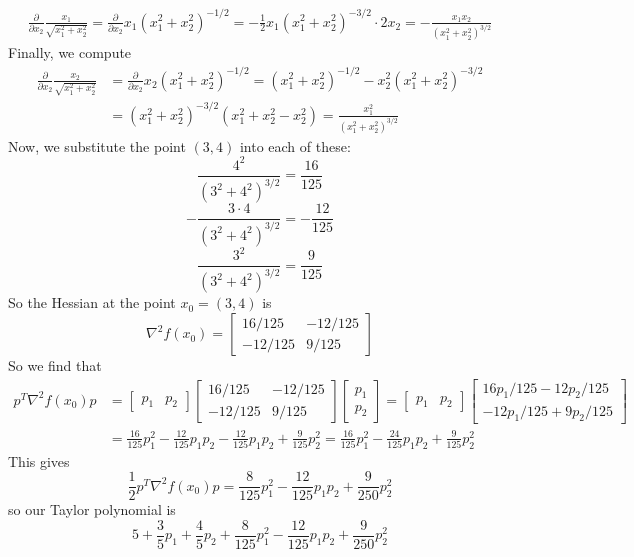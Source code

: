 \documentclass[12pt]{article}
\begin{document}
\begin{align*}
\frac{\partial}{\partial x_2} \frac{x_1}{\sqrt{x_1^2+x_2^2}} = \frac{\partial}{\partial x_2} x_1(x_1^2+x_2^2)^{-1/2} = -\frac{1}{2}x_1(x_1^2+x_2^2)^{-3/2}\cdot2x_2 = -\frac{x_1x_2}{(x_1^2+x_2^2)^{3/2}}
\end{align*} Finally, we compute
\begin{align*}
\frac{\partial}{\partial x_2} \frac{x_2}{\sqrt{x_1^2+x_2^2}} &= \frac{\partial}{\partial x_2} x_2(x_1^2+x_2^2)^{-1/2} = (x_1^2+x_2^2)^{-1/2} - x_2^2(x_1^2+x_2^2)^{-3/2}\\
& = (x_1^2+x_2^2)^{-3/2}(x_1^2+x_2^2 - x_2^2) = \frac{x_1^2}{(x_1^2+x_2^2)^{3/2}}
\end{align*} Now, we substitute the point $(3,4)$ into each of these:
\[
\frac{4^2}{(3^2+4^2)^{3/2}} = \frac{16}{125}
\]
\[
-\frac{3 \cdot 4}{(3^2+4^2)^{3/2}} = -\frac{12}{125}
\]
\[
\frac{3^2}{(3^2+4^2)^{3/2}} = \frac{9}{125}
\] So the Hessian at the point $x_0 = (3,4)$ is
\[
\nabla^2 f(x_0) =
\begin{bmatrix}
16/125 & -12/125\\
-12/125 & 9/125
\end{bmatrix}
\] So we find that
\begin{align*}
p^T \nabla^2 f(x_0) p & = 
\begin{bmatrix} 
p_1 & p_2
\end{bmatrix}
\begin{bmatrix}
16/125 & -12/125\\
-12/125 & 9/125
\end{bmatrix}
\begin{bmatrix}
p_1\\
p_2
\end{bmatrix}
 =
\begin{bmatrix} 
p_1 & p_2
\end{bmatrix}
\begin{bmatrix}
16p_1/125 - 12p_2/125\\
-12p_1/125 + 9p_2/125
\end{bmatrix} \\
& = \frac{16}{125}p_1^2 - \frac{12}{125}p_1p_2 - \frac{12}{125}p_1p_2 + \frac{9}{125}p_2^2 = \frac{16}{125}p_1^2 - \frac{24}{125}p_1p_2 + \frac{9}{125}p_2^2
\end{align*} This gives 
\[
\frac{1}{2} p^T \nabla^2 f(x_0) p = \frac{8}{125}p_1^2 - \frac{12}{125}p_1p_2 + \frac{9}{250}p_2^2
\] so our Taylor polynomial is 
\[
5 + \frac{3}{5}p_1 + \frac{4}{5}p_2 +  \frac{8}{125}p_1^2 - \frac{12}{125}p_1p_2 + \frac{9}{250}p_2^2
\]
\newpage
\end{document}
